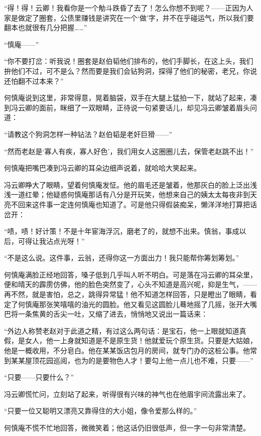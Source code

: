 \par “得！得！云卿！我看你是一个觔斗跌昏了去了！怎么你想不到呢？——正因为人家是做定了圈套，公债里赚钱是讲究在一个‘做’字，并不在乎碰运气，所以我们要翻本也就很有几分把握……”
\par “慎庵——”
\par “你不要打岔：听我说！圈套是赵伯韬他们排布的，他们手脚长，在这上头，我们拚他们不过，可不是么？然而要是我们会钻狗洞，探得了他们的秘密，老兄，你说还怕翻不过本来？”
\par 何慎庵说到这里，非常得意，晃着脑袋，双手在大腿上猛拍一下，就站了起来，凑到冯云卿的面前，眯细了一双眼睛，正待说一句紧要话儿，却见冯云卿皱着眉头问道：
\par “请教这个狗洞怎样一种钻法？赵伯韬是老奸巨猾——”
\par “然而老赵是‘寡人有疾，寡人好色’，我们用女人这圈圈儿去，保管老赵跳不出！”
\par 何慎庵把嘴巴凑到冯云卿的耳朵边细声说着，就哈哈大笑起来。
\par 冯云卿睁大了眼睛，望着何慎庵发怔。他的眉毛还是皱着，他那灰白的脸上泛出浅浅一道红晕；他疑惑何慎庵那话有八分是开玩笑，他想来自己的姨太太每夜非到天亮不回来这件事一定连何慎庵也知道了。可是他只得假装痴呆，懒洋洋地打算把话岔开：
\par “啧，啧！好计策！不是十年宦海浮沉，磨老了的，就想不出来。慎翁，事成以后，可得让我沾点光呀！”
\par “不是这么说。这件事，云翁，还得你这一方面出力！我只能帮你筹划筹划。”
\par 何慎庵满脸正经地回答，嗓子低到几乎叫人听不明白。可是落在冯云卿的耳朵里，便和晴天的霹雳仿佛，他的脸色突然变了，心头不知道是高兴呢，抑是生气，——再不然，就是害怕，总之，跳得异常猛！他不知道怎样回答，只是瞪出了眼睛，看定了何慎庵那张笑嘻嘻的油光的圆脸。他又看见这圆脸儿蓦地摇了几摇，张开大嘴巴将一条焦黄的舌尖一吐，又缩了进去，悄悄地又说出一篇话来：
\par “外边人称赞老赵对于此道之精，有过这么两句话：是宝石，他一上眼就知道真假，是女人，他一上身就知道是不是原生货！他就爱玩个原生货。只要是大姑娘，他是一概收用，不分皂白。他在某某饭店包月的房间，就专门办的这桩公事。他常到某某屋顶花园巡阅，也为的是要物色人才！要勾上他一点儿也不难，只要——”
\par “只要——只要什么？”
\par 冯云卿慌忙问，立刻站了起来，听得很有兴味的神气也在他眉宇间流露出来了。
\par “只要一位又聪明又漂亮又靠得住的大小姐，像令爱那么样的。”
\par 何慎庵不慌不忙地回答，微微笑着；他这话仍旧很低声，但一字一句非常清楚。
